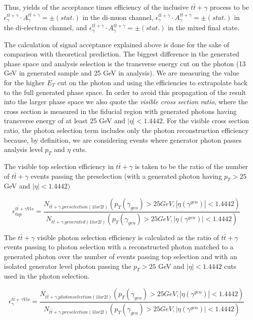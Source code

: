 Thus, yields of the acceptance times efficiency of the inclusive $t\bar{t}+\gamma$ process to be $\epsilon^{t\bar{t}+\gamma}_{\gamma} \cdot A^{t\bar{t}+\gamma}_{\gamma} =   \pm  (stat.)$ in the di-muon channel, $\epsilon^{t\bar{t}+\gamma}_{\gamma} \cdot A^{t\bar{t}+\gamma}_{\gamma} =  \pm  (stat.)$ in the di-electron channel, and $\epsilon^{t\bar{t}+\gamma}_{\gamma} \cdot A^{t\bar{t}+\gamma}_{\gamma} =  \pm  (stat.)$ in the mixed final state.

The calculation of signal acceptance explained above is done for the sake of comparison with theoretical prediction. The biggest difference in the generated phase space and analysis selection is the transverse energy cut on the photon (13 GeV in generated sample and 25 GeV in analysis). We are measuring the value for the higher $E_T$ cut on the photon and using the efficiencies to extrapolate back to the full generated phase space. In order to avoid this propagation of the result into the larger phase space we also quote the \emph{visible cross section ratio}, where the cross section is measured in the fiducial region with generated photons having transverse energy of at least 25 GeV and $| \eta | < 1.4442$. For the visible cross section ratio, the photon selection term includes only the photon reconstruction efficiency because, by definition, we are considering events where generator photon passes analysis level $p_T$ and $\eta$ cuts.

The visible top selection efficiency in $t\bar{t}+\gamma$ is taken to be the ratio of the number of $t\bar{t}+\gamma$ events passing the preselection (with a generated photon having $p_T > 25$ GeV and $| \eta | < 1.4442)$

\begin{equation}
	\epsilon^{t\bar{t}+\gamma Vis}_{top} = \frac{N_{t\bar{t}+\gamma.preselection(1lor2l)}\left( p_T(\gamma_{gen}) > 25 GeV, |\eta(\gamma^{gen})| < 1.4442 \right)}{N_{t\bar{t}+\gamma.generated(1lor2l)}\left( p_T(\gamma_{gen}) > 25 GeV, |\eta(\gamma^{gen})| < 1.4442 \right)} 
\end{equation}

The $t\bar{t}+\gamma$ visible photon selection efficiency is calculated as the ratio of $t\bar{t}+\gamma$ events passing to photon selection with a reconstructed photon matched to a generated photon over the number of events passing top selection and with an isolated generator level photon passing the $p_T > 25$ GeV and $| \eta | < 1.4442$ cuts used in the photon selection.

\begin{equation}
	\epsilon^{t\bar{t}+\gamma Vis}_{\gamma} = \frac{N_{t\bar{t}+\gamma.photonselection(1lor2l)}\left( p_T(\gamma_{gen}) > 25 GeV, |\eta(\gamma^{gen})| < 1.4442 \right)}{N_{t\bar{t}+\gamma.preselection(1lor2l)}\left( p_T(\gamma_{gen}) > 25 GeV, |\eta(\gamma^{gen})| < 1.4442 \right)} 
\end{equation}

